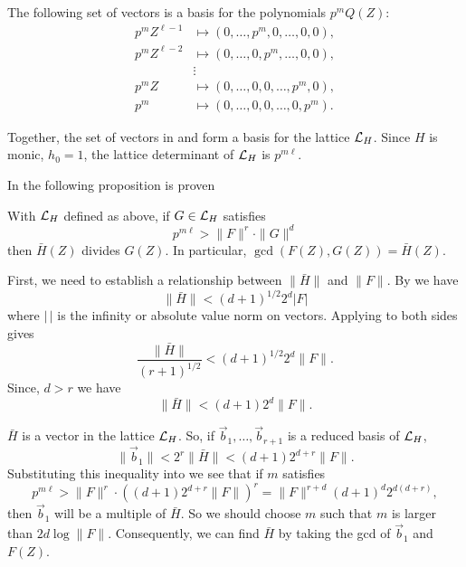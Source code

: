 The following set of vectors is a basis for the polynomials $p^m
Q(Z)$:
\begin{equation} \label{Second:LLL:Eq}
\begin{aligned}
p^m Z^{\ell -1} & \mapsto (0,  \ldots, p^m, 0, \ldots, 0, 0), \\
p^m Z^{\ell -2} & \mapsto (0,  \ldots, 0, p^m, \ldots, 0, 0), \\
& \vdots\\
p^m Z & \mapsto (0, \ldots, 0, 0, \ldots, p^m, 0), \\
p^m & \mapsto (0, \ldots, 0, 0, \ldots, 0, p^m).
\end{aligned}
\end{equation}

Together, the set of vectors in  and
 form a basis for the lattice ${\cal L}_H$.  Since 
$H$ is monic, $h_0 = 1$, the lattice determinant of ${\cal L}_H$ is $p^{m 
\ell}$. 

In \cite{Lenstra1982-gx} the following proposition is proven

\begin{proposition}  With ${\cal L}_H$ defined as
above, if $G \in {\cal L}_H$ satisfies
\begin{equation} \label{LLL:Factor:Eq}
p^{m\ell} > \|F\|^r \cdot \|G\|^d
\end{equation}
then $\bar{H}(Z)$ divides $G(Z)$.  In particular, $\gcd(F(Z), G(Z)) =
\bar{H}(Z)$.
\end{proposition}

First, we need to establish a relationship between $\|\bar{H}\|$ and
$\|F\|$.  By  we have
\[
\|\bar{H}\| < (d+1)^{1/2} 2^d |F|
\]
where $|\,|$ is the infinity or absolute value norm on vectors.
Applying  to both sides gives
\[
\frac{\|\bar{H}\|}{(r+1)^{1/2}} <  (d+1)^{1/2} 2^d \|F\|.
\]
Since, $d > r$ we have
\begin{equation} \label{Factor:2Norm:Eq}
\|\bar{H}\| < (d+1) 2^d \|F\|.
\end{equation}

$\bar{H}$ is a vector in the lattice ${\cal L}_H$.  So, if $\vec{b}_1,
\ldots, \vec{b}_{r+1}$ is a reduced basis of ${\cal L}_H$, 
\[
\|\vec{b}_1\| < 2^r \| \bar{H} \| < (d+1) 2^{d+r} \|F\|.
\]
Substituting this inequality into  we see that
if $m$ satisfies
\[
p^{m\ell} > \|F\|^r \cdot \left( (d+1) 2^{d+r} \|F\|\right)^r
 = \|F\|^{r+d} (d+1)^d 2^{d(d+r)},
\]
then $\vec{b}_1$ will be a multiple of $\bar{H}$.  So we should choose
$m$ such that $m$ is larger than $2d \log \|F\|$.  Consequently, we can
find $\bar{H}$ by taking the {\sc gcd} of $\vec{b}_1$ and $F(Z)$.

